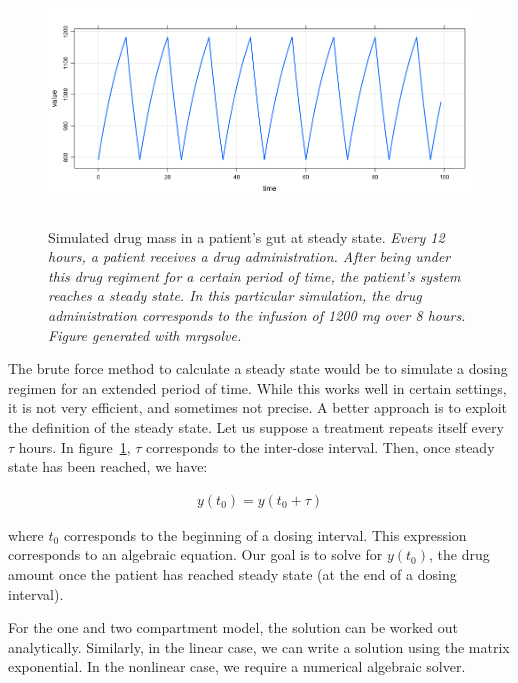 \documentclass[11pt]{amsart}
\begin{document}
\begin{figure}[!htb]
\begin{center}
\includegraphics[width = 5in, height = 2.5in, trim=0in 0in 0 0in]{graphics/SS.png}
\caption{Simulated drug mass in a patient's gut at steady state. \textit{Every 12 hours, a patient
receives a drug administration. After being under this drug regiment for a certain period of time, 
the patient's system reaches a steady state. In this particular simulation, the drug administration
corresponds to the infusion of 1200 mg over 8 hours. Figure generated with mrgsolve.}}
\label{fig:steadyState}
\end{center}
\end{figure}

The brute force method to calculate a steady state would be to simulate a dosing regimen
for an extended period of time. While this works well in certain settings, it is not very efficient,
and sometimes not precise. A better approach is to exploit the definition of the steady state.
Let us suppose a treatment repeats itself every $\tau$ hours. In figure~\ref{fig:steadyState},
$\tau$ corresponds to the inter-dose interval. Then, once steady state has been reached,
we have:

\begin{eqnarray}
y(t_0) = y(t_0 + \tau)
\end{eqnarray}

where $t_0$ corresponds to the beginning of a dosing interval. This expression corresponds 
to an algebraic equation. Our goal is to solve for $y(t_0)$, the drug amount once the
patient has reached steady state (at the end of a dosing interval).

For the one and two compartment model, the solution can be worked out analytically. Similarly,
in the linear case, we can write a solution using the matrix exponential. In the nonlinear
case, we require a numerical algebraic solver.
\end{document}

